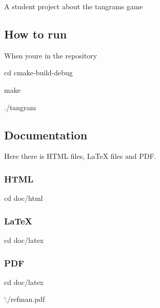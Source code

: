 A student project about the tangram\textquotesingle{}s game

\subsection*{How to run}

When you\textquotesingle{}re in the repository
\begin{DoxyItemize}
\item {\ttfamily cd cmake-\/build-\/debug}
\item {\ttfamily make}
\item {\ttfamily ./tangram}
\end{DoxyItemize}

\subsection*{Documentation}

Here there is H\+T\+ML files, La\+TeX files and P\+DF. \subsubsection*{H\+T\+ML}


\begin{DoxyItemize}
\item {\ttfamily cd doc/html} \subsubsection*{La\+TeX}
\end{DoxyItemize}


\begin{DoxyItemize}
\item {\ttfamily cd doc/latex} \subsubsection*{P\+DF}
\end{DoxyItemize}


\begin{DoxyItemize}
\item {\ttfamily cd doc/latex}
\item `./refman.pdf 
\end{DoxyItemize}